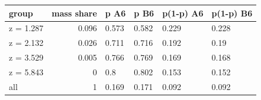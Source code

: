 \begingroup\small
\setlength{\tabcolsep}{3pt}
\renewcommand{\arraystretch}{1.04}
\begin{tabularx}{\linewidth}{XrXXXX}
\toprule
group & mass share & p A6 & p B6 & p(1-p) A6 & p(1-p) B6 \\
\midrule
z = 1.287 & 0.096 & 0.573 & 0.582 & 0.229 & 0.228 \\
z = 2.132 & 0.026 & 0.711 & 0.716 & 0.192 & 0.19 \\
z = 3.529 & 0.005 & 0.766 & 0.769 & 0.169 & 0.168 \\
z = 5.843 & 0 & 0.8 & 0.802 & 0.153 & 0.152 \\
all & 1 & 0.169 & 0.171 & 0.092 & 0.092 \\
\bottomrule
\end{tabularx}
\endgroup
